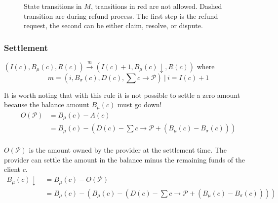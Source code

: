 \documentclass{llncs}
\begin{document}
\begin{figure}[h]
{}
\caption{State transitions in $M$, transitions in red are not allowed. Dashed transition are during refund process. The first step is the refund request, the second can be either claim, resolve, or dispute.}
\label{fig:contractStateTransitions}
\end{figure}

\subsubsection{Settlement} $(I(c), B_\mu(c), R(c)) \xrightarrow{m} (I(c)+1, B_\mu(c)\downarrow, R(c))$ where
$$m = (i, B_\sigma(c), D(c), \textstyle\sum c \rightarrow \mathcal{P})\ |\ i = I(c)+1$$

It is worth noting that with this rule it is not possible to settle a zero amount because the balance amount $B_\mu(c)$ must go down!
\begin{equation*}
\begin{split}
    O(\mathcal{P}) &= B_\mu(c) - A(c) \\
    &= B_\mu(c) - (D(c) - \textstyle \sum c \rightarrow \mathcal{P} + (B_\mu(c) - B_\sigma(c))) \\
\end{split}
\end{equation*}

$O(\mathcal{P})$ is the amount owned by the provider at the settlement time. The provider can settle the amount in the balance minus the remaining funds of the client $c$.
\begin{equation*}
\begin{split}
    B_\mu(c)\downarrow \ &= B_\mu(c) - O(\mathcal{P}) \\
    &= B_\mu(c) -(B_\mu(c) - (D(c) - \textstyle \sum c \rightarrow \mathcal{P} + (B_\mu(c) - B_\sigma(c)))) \\
\end{split}
\end{equation*}
\end{document}
